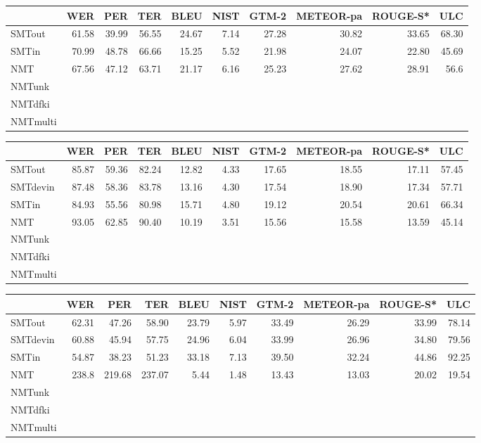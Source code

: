 \documentclass[a4paper,11pt]{article}
\begin{document}
\begin{table}[t]
\footnotesize

\begin{tabular}{lrrrrrrrrr}
\toprule
         & WER   &  PER  & TER   &  BLEU & NIST & GTM-2 & METEOR-pa & ROUGE-S* & ULC \\
\midrule
SMTout	 & 61.58 & 39.99 & 56.55 & 24.67 & 7.14 & 27.28 & 30.82 & 33.65 & 68.30 \\  
SMTin	 & 70.99 & 48.78 & 66.66 & 15.25 & 5.52 & 21.98 & 24.07 & 22.80 & 45.69 \\  
NMT	 & 67.56 & 47.12 & 63.71 & 21.17 & 6.16 & 25.23 & 27.62 & 28.91 & 56.6 \\  
NMTunk  \\
NMTdfki \\
NMTmulti \\
\bottomrule
\end{tabular}

\begin{tabular}{lrrrrrrrrr}
\toprule
         & WER   &  PER  & TER   &  BLEU & NIST & GTM-2 & METEOR-pa & ROUGE-S* & ULC \\
\midrule

SMTout	 & 85.87 & 59.36 & 82.24 & 12.82 & 4.33 & 17.65 & 18.55 & 17.11 & 57.45 \\  
SMTdevin & 87.48 & 58.36 & 83.78 & 13.16 & 4.30 & 17.54 & 18.90 & 17.34 & 57.71 \\  
SMTin	 & 84.93 & 55.56 & 80.98 & 15.71 & 4.80 & 19.12 & 20.54 & 20.61 & 66.34 \\  
NMT	 & 93.05 & 62.85 & 90.40 & 10.19 & 3.51 & 15.56 & 15.58 & 13.59 & 45.14 \\  
NMTunk  \\
NMTdfki \\
NMTmulti \\
\bottomrule
\end{tabular}


\begin{tabular}{lrrrrrrrrr}
\toprule
         & WER   &  PER  & TER   &  BLEU & NIST & GTM-2 & METEOR-pa & ROUGE-S* & ULC \\
\midrule
SMTout   & 62.31 & 47.26 & 58.90 & 23.79 & 5.97 & 33.49 & 26.29 & 33.99 & 78.14 \\  
SMTdevin & 60.88 & 45.94 & 57.75 & 24.96 & 6.04 & 33.99 & 26.96 & 34.80 & 79.56 \\  
SMTin	 & 54.87 & 38.23 & 51.23 & 33.18 & 7.13 & 39.50 & 32.24 & 44.86 & 92.25 \\  
NMT      & 238.8 & 219.68 & 237.07 & 5.44 & 1.48 & 13.43 & 13.03 & 20.02 & 19.54 \\  
NMTunk  \\
NMTdfki \\
NMTmulti \\
\bottomrule
\end{tabular}


\end{table}
\end{document}
